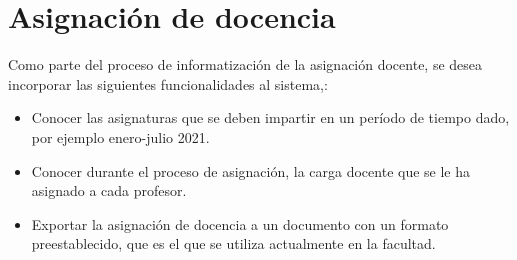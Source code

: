 

\section{Asignación de docencia}\label{docencia:cap2}

Como parte del proceso de informatización de la asignación docente, se 
desea incorporar las siguientes funcionalidades al sistema,:


\begin{itemize}
    \item Conocer las asignaturas que se deben impartir en un período de tiempo dado, por ejemplo enero-julio 2021.
    \item Conocer durante el proceso de asignación, la carga docente que se le ha asignado a cada profesor.
    \item Exportar la asignación de docencia a un documento con un formato preestablecido, que 
    es el que se utiliza actualmente en la facultad.
\end{itemize}





